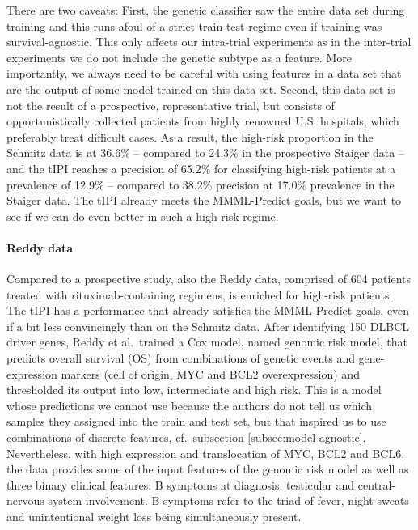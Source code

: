 There are two caveats: First, the genetic classifier saw the entire data set during training and 
this runs afoul of a strict train-test regime even if training was 
survival-agnostic. This only affects our intra-trial experiments as in the inter-trial experiments 
we do not include the genetic subtype as a feature. More importantly, we always need 
to be careful with using features in a data set that are the output of some model trained on this 
data set. Second, this data set is not the result of a 
prospective, representative trial, but consists of opportunistically collected patients from highly renowned 
U.S. hospitals, which preferably treat 
difficult cases. As a result, the high-risk proportion in the Schmitz data is at \num{36.6}\% -- 
compared to \num{24.3}\% in the prospective Staiger data -- and the tIPI reaches a precision of 
\num{65.2}\% for classifying high-risk patients at a prevalence of \num{12.9}\% -- compared to 
\num{38.2}\% precision at \num{17.0}\% prevalence in the Staiger data. The tIPI already meets the 
MMML-Predict goals, but we want to see if we can do even better in such a high-risk regime.

\paragraph{Reddy data}

Compared to a prospective study, also the Reddy data, comprised of \num{604} patients treated with 
rituximab-containing regimens, is enriched for high-risk patients. The 
tIPI has a performance that already satisfies the MMML-Predict goals, even if a bit less 
convincingly than on the Schmitz data. After identifying \num{150} DLBCL driver genes, Reddy et al.\ 
trained a Cox model, named genomic risk model,
that predicts overall survival (OS) from combinations of genetic events and gene-expression markers 
(cell of origin, MYC and BCL2 overexpression) and thresholded its output into low, intermediate and 
high risk. This is a
model whose predictions we cannot use because the authors do not tell us which samples they assigned
into the train and test set, but that inspired us to use combinations of discrete features, cf.\ 
subsection 
\ref{subsec:model-agnostic}. Nevertheless, with high expression and translocation of MYC, BCL2 and 
BCL6, the data provides some of the input features of the genomic risk model as well as three binary 
clinical features: B symptoms at diagnosis, testicular and central-nervous-system involvement. B 
symptoms refer to the triad of fever, night sweats and unintentional weight 
loss being simultaneously present.

